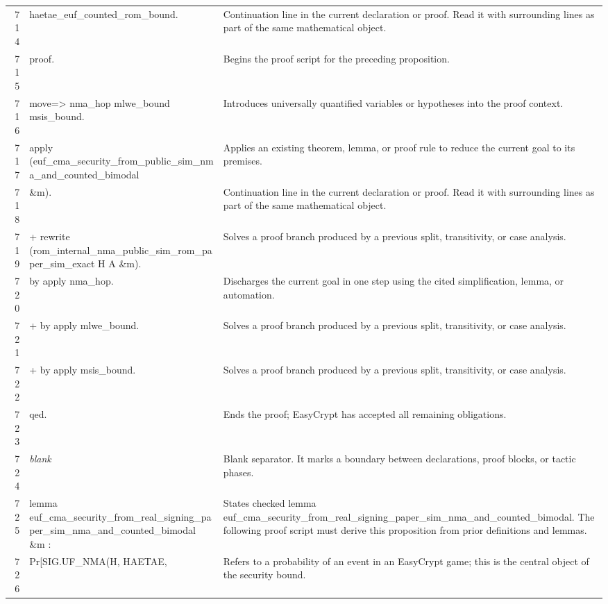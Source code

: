 \documentclass[10pt]{article}
\begin{document}
\begin{longtable}{r L{0.53\textwidth} L{0.37\textwidth}}
714 & {\ttfamily\scriptsize     haetae\_euf\_counted\_rom\_bound.} & Continuation line in the current declaration or proof.  Read it with surrounding lines as part of the same mathematical object. \\
715 & {\ttfamily\scriptsize proof.} & Begins the proof script for the preceding proposition. \\
716 & {\ttfamily\scriptsize move=> nma\_hop mlwe\_bound msis\_bound.} & Introduces universally quantified variables or hypotheses into the proof context. \\
717 & {\ttfamily\scriptsize apply (euf\_cma\_security\_from\_public\_sim\_nma\_and\_counted\_bimodal} & Applies an existing theorem, lemma, or proof rule to reduce the current goal to its premises. \\
718 & {\ttfamily\scriptsize          \&m).} & Continuation line in the current declaration or proof.  Read it with surrounding lines as part of the same mathematical object. \\
719 & {\ttfamily\scriptsize + rewrite (rom\_internal\_nma\_public\_sim\_rom\_paper\_sim\_exact H A \&m).} & Solves a proof branch produced by a previous split, transitivity, or case analysis. \\
720 & {\ttfamily\scriptsize   by apply nma\_hop.} & Discharges the current goal in one step using the cited simplification, lemma, or automation. \\
721 & {\ttfamily\scriptsize + by apply mlwe\_bound.} & Solves a proof branch produced by a previous split, transitivity, or case analysis. \\
722 & {\ttfamily\scriptsize + by apply msis\_bound.} & Solves a proof branch produced by a previous split, transitivity, or case analysis. \\
723 & {\ttfamily\scriptsize qed.} & Ends the proof; EasyCrypt has accepted all remaining obligations. \\
724 & {\ttfamily\scriptsize \emph{blank}} & Blank separator.  It marks a boundary between declarations, proof blocks, or tactic phases. \\
725 & {\ttfamily\scriptsize lemma euf\_cma\_security\_from\_real\_signing\_paper\_sim\_nma\_and\_counted\_bimodal \&m :} & States checked lemma euf\_cma\_security\_from\_real\_signing\_paper\_sim\_nma\_and\_counted\_bimodal.  The following proof script must derive this proposition from prior definitions and lemmas. \\
726 & {\ttfamily\scriptsize   Pr[SIG.UF\_NMA(H, HAETAE,} & Refers to a probability of an event in an EasyCrypt game; this is the central object of the security bound. \\

\end{longtable}
\end{document}

